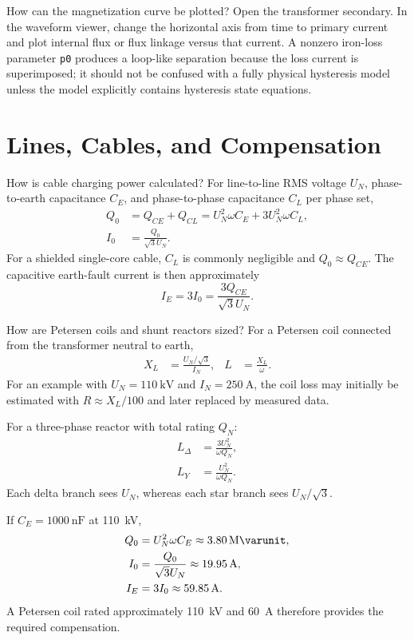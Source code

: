 \begin{formulaBox}{How can the magnetization curve be plotted?}
Open the transformer secondary. In the waveform viewer, change the horizontal
axis from time to primary current and plot internal flux or flux linkage versus
that current. A nonzero iron-loss parameter \texttt{p0} produces a loop-like
separation because the loss current is superimposed; it should not be confused
with a fully physical hysteresis model unless the model explicitly contains
hysteresis state equations.
\end{formulaBox}

\section{Lines, Cables, and Compensation}

\begin{formulaBox}{How is cable charging power calculated?}
For line-to-line RMS voltage $U_N$, phase-to-earth capacitance $C_E$, and
phase-to-phase capacitance $C_L$ per phase set,
\begin{align}
Q_0&=Q_{CE}+Q_{CL}
   =U_N^2\omega C_E+3U_N^2\omega C_L,\\
I_0&=\frac{Q_0}{\sqrt{3}U_N}.
\end{align}
For a shielded single-core cable, $C_L$ is commonly negligible and
$Q_0\approx Q_{CE}$. The capacitive earth-fault current is then approximately
\begin{equation}
I_E=3I_0=\frac{3Q_{CE}}{\sqrt{3}U_N}.
\end{equation}
\end{formulaBox}

\begin{formulaBox}{How are Petersen coils and shunt reactors sized?}
For a Petersen coil connected from the transformer neutral to earth,
\begin{align}
X_L&=\frac{U_N/\sqrt{3}}{I_N}, &
L&=\frac{X_L}{\omega}.
\end{align}
For an example with $U_N=\SI{110}{\kilo\volt}$ and
$I_N=\SI{250}{\ampere}$, the coil loss may initially be estimated with
$R\approx X_L/100$ and later replaced by measured data.

For a three-phase reactor with total rating $Q_N$:
\begin{align}
L_\Delta&=\frac{3U_N^2}{\omega Q_N},\\
L_Y&=\frac{U_N^2}{\omega Q_N}.
\end{align}
Each delta branch sees $U_N$, whereas each star branch sees $U_N/\sqrt{3}$.

If $C_E=\SI{1000}{\nano\farad}$ at \SI{110}{\kilo\volt},
\begin{align}
Q_0&=U_N^2\omega C_E\approx\SI{3.80}{\mega\varunit},\\
I_0&=\frac{Q_0}{\sqrt{3}U_N}\approx\SI{19.95}{\ampere},\\
I_E&=3I_0\approx\SI{59.85}{\ampere}.
\end{align}
A Petersen coil rated approximately \SI{110}{\kilo\volt} and
\SI{60}{\ampere} therefore provides the required compensation.
\end{formulaBox}

